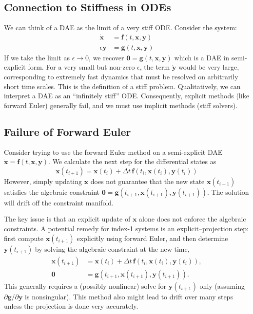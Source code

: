 \subsection{Connection to Stiffness in ODEs}

We can think of a DAE as the limit of a very stiff ODE. Consider the system:
\begin{align}
    \dot{\mathbf{x}} &= \mathbf{f}(t, \mathbf{x}, \mathbf{y}) \\
    \epsilon \dot{\mathbf{y}} &= \mathbf{g}(t, \mathbf{x}, \mathbf{y})
\end{align}
If we take the limit as $\epsilon \to 0$, we recover $\mathbf{0} = \mathbf{g}(t, \mathbf{x}, \mathbf{y})$ which is a DAE in semi-explicit form. For a very small but non-zero $\epsilon$, the term $\dot{\mathbf{y}}$ would be very large, corresponding to extremely fast dynamics that must be resolved on arbitrarily short time scales. This is the definition of a stiff problem. Qualitatively, we can interpret a DAE as an ``infinitely stiff'' ODE. Consequently, explicit methods (like forward Euler) generally fail, and we must use implicit methods (stiff solvers).

\subsection{Failure of Forward Euler}

Consider trying to use the forward Euler method on a semi-explicit DAE $\dot{\mathbf{x}} = \mathbf{f}(t, \mathbf{x}, \mathbf{y})$. We calculate the next step for the differential states as
\begin{equation}
    \mathbf{x}(t_{i+1}) = \mathbf{x}(t_i) + \Delta t \, \mathbf{f}(t_i, \mathbf{x}(t_i), \mathbf{y}(t_i))
\end{equation}
However, simply updating $\mathbf{x}$ does not guarantee that the new state $\mathbf{x}(t_{i+1})$ satisfies the algebraic constraint $\mathbf{0} = \mathbf{g}(t_{i+1}, \mathbf{x}(t_{i+1}), \mathbf{y}(t_{i+1}))$. The solution will drift off the constraint manifold. 

The key issue is that an explicit update of $\mathbf{x}$ alone does not enforce the algebraic constraints. A potential remedy for index-1 systems is an explicit--projection step: first compute $\mathbf{x}(t_{i+1})$ explicitly using forward Euler, and then determine $\mathbf{y}(t_{i+1})$ by solving the algebraic constraint at the new time,
\begin{align}
\mathbf{x}(t_{i+1}) &= \mathbf{x}(t_i) + \Delta t\,\mathbf{f}(t_i,\mathbf{x}(t_i),\mathbf{y}(t_i)),\\
\mathbf{0} &= \mathbf{g}(t_{i+1},\mathbf{x}(t_{i+1}),\mathbf{y}(t_{i+1})).
\end{align}
This generally requires a (possibly nonlinear) solve for $\mathbf{y}(t_{i+1})$ only (assuming $\partial \mathbf{g}/\partial \mathbf{y}$ is nonsingular). This method also might lead to drift over many steps unless the projection is done very accurately. 

